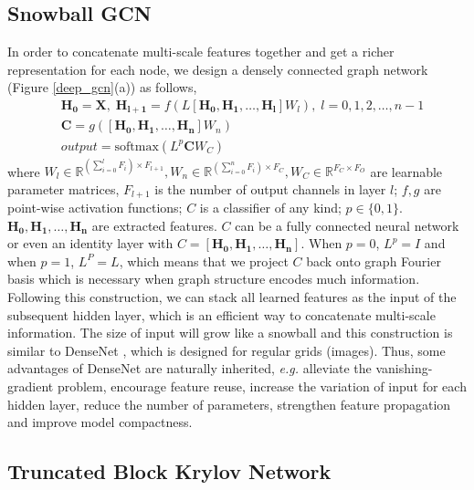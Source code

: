 \documentclass{article}
\newcommand\eg{\textit{e.g.}}
\begin{document}
\subsection{Snowball GCN}
\label{snowball_gcn}
In order to concatenate multi-scale features together and get a richer representation for each node, we design a densely connected graph network (Figure \ref{deep_gcn}(a)) as follows,
\begin{align}
\label{snowball}
&\bm{H_0} = \bm{X},\; \bm{H_{l+1}} = f \left( L \left[ \bm{H_0}, \bm{H_1},\dots, \bm{H_l} \right] W_l \right),\; l=0,1,2,\dots,n - 1 \nonumber \\
& \bm{C} = g \left( \left[ \bm{H_0}, \bm{H_1},\dots, \bm{H_n} \right] W_n \right)\\
&output = \text{softmax} \left( L^{p} \bm{C} W_C \right) \nonumber
\end{align}
where $W_l \in \mathbb{R}^{\left( \sum\limits_{i=0}^l F_i \right)  \times F_{l+1} }, W_n \in \mathbb{R}^{\left( \sum\limits_{i=0}^n F_i \right)  \times F_C}, W_C \in \mathbb{R}^{F_C \times F_O}$ are learnable parameter matrices, $F_{l+1}$ is the number of output channels in layer $l$; $f, g$ are point-wise activation functions; $C$ is a classifier of any kind; $p \in \{0,1\}$. $\bm{H_0}, \bm{H_1},\dots, \bm{H_n}$ are extracted features. $C$ can be a fully connected neural network or even an identity layer with $C=[\bm{H_0}, \bm{H_1},\dots, \bm{H_n}]$. When $p=0$, $L^p=I$ and when $p=1$, $L^P=L$, which means that we project $C$ back onto graph Fourier basis which is necessary when graph structure encodes much information. Following this construction, we can stack all learned features as the input of the subsequent hidden layer, which is an efficient way to concatenate multi-scale information. The size of input will grow like a snowball and this construction is similar to DenseNet \cite{huang2017densely}, which is designed for regular grids (images). Thus, some advantages of DenseNet are naturally inherited, \eg{} alleviate the vanishing-gradient problem, encourage feature reuse, increase the variation of input for each hidden layer, reduce the number of parameters, strengthen feature propagation and improve model compactness.

\subsection{Truncated Block Krylov Network}
\end{document}
